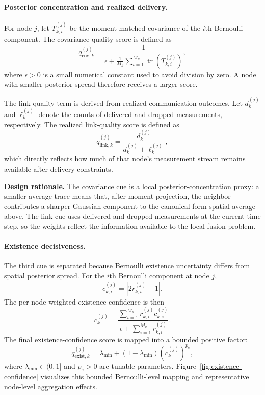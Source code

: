 \paragraph{Posterior concentration and realized delivery.}

For node $j$, let $T_{k,i}^{(j)}$ be the moment-matched covariance of the $i$th Bernoulli component. The covariance-quality score is defined as
\begin{equation}
q_{\mathrm{cov},k}^{(j)}
=
\frac{1}{\epsilon + \frac{1}{M_k}\sum_{i=1}^{M_k}\operatorname{tr}\!\left(T_{k,i}^{(j)}\right)},
\end{equation}
where $\epsilon>0$ is a small numerical constant used to avoid division by zero. A node with smaller posterior spread therefore receives a larger score.

The link-quality term is derived from realized communication outcomes. Let $d_k^{(j)}$ and $\ell_k^{(j)}$ denote the counts of delivered and dropped measurements, respectively. The realized link-quality score is defined as
\begin{equation}
q_{\mathrm{link},k}^{(j)}
=
\frac{d_k^{(j)}}{d_k^{(j)} + \ell_k^{(j)}},
\end{equation}
which directly reflects how much of that node's measurement stream remains available after delivery constraints.

\noindent\textbf{Design rationale.}
The covariance cue is a local posterior-concentration proxy: a smaller average trace means that, after moment projection, the neighbor contributes a sharper Gaussian component to the canonical-form spatial average above. The link cue uses delivered and dropped measurements at the current time step, so the weights reflect the information available to the local fusion problem.

\paragraph{Existence decisiveness.}

The third cue is separated because Bernoulli existence uncertainty differs from spatial posterior spread. For the $i$th Bernoulli component at node $j$,
\begin{equation}
c_{k,i}^{(j)} = \left|2r_{k,i}^{(j)} - 1\right|.
\end{equation}
The per-node weighted existence confidence is then
\begin{equation}
\bar{c}_{k}^{(j)} =
\frac{\sum_{i=1}^{M_k} r_{k,i}^{(j)} c_{k,i}^{(j)}}
{\epsilon + \sum_{i=1}^{M_k} r_{k,i}^{(j)}}.
\end{equation}
The final existence-confidence score is mapped into a bounded positive factor:
\begin{equation}
q_{\mathrm{exist},k}^{(j)}
=
\lambda_{\min} + (1-\lambda_{\min})\left(\bar{c}_{k}^{(j)}\right)^{p_e},
\end{equation}
where $\lambda_{\min} \in (0,1]$ and $p_e > 0$ are tunable parameters.
Figure~\ref{fig:existence-confidence} visualizes this bounded Bernoulli-level mapping and representative node-level aggregation effects.

